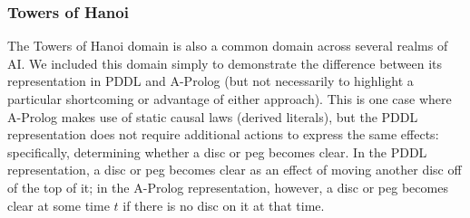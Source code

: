 \subsubsection{Towers of Hanoi}
The Towers of Hanoi domain is also a common domain across several realms of AI. We included this domain simply to demonstrate the difference between its representation in PDDL and A-Prolog (but not necessarily to highlight a particular shortcoming or advantage of either approach). This is one case where A-Prolog makes use of static causal laws (derived literals), but the PDDL representation does not require additional actions to express the same effects: specifically, determining whether a disc or peg becomes clear. In the PDDL representation, a disc or peg becomes clear as an effect of moving another disc off of the top of it; in the A-Prolog representation, however, a disc or peg becomes clear at some time $t$ if there is no disc on it at that time. 


